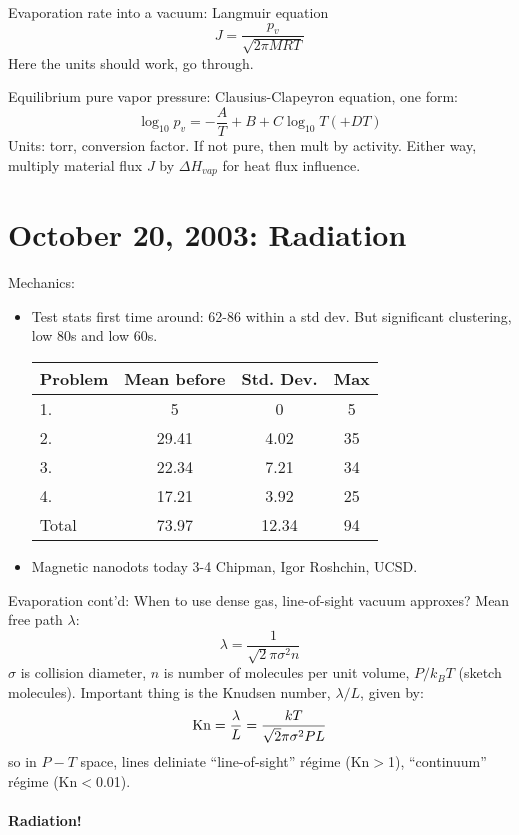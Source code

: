 \documentclass{report}
\begin{document}
Evaporation rate into a vacuum: Langmuir equation
$$J = \frac{p_v}{\sqrt{2\pi MRT}}$$
Here the units should work, go through.

Equilibrium pure vapor pressure: Clausius-Clapeyron equation, one form:
$$\log_{10}p_v = -\frac{A}{T} + B + C\log_{10}T (+ DT)$$
Units: torr, conversion factor.  If not pure, then mult by activity.  Either
way, multiply material flux $J$ by $\Delta H_{vap}$ for heat flux influence.
\newpage


\section{October 20, 2003: Radiation}

Mechanics:
\begin{itemize}
\item Test stats first time around: 62-86 within a std dev.  But significant
  clustering, low 80s and low 60s.
  \begin{center}
    \begin{tabular}{l|ccc|}
      Problem & Mean before & Std. Dev. & Max \\
      \hline
      1. & 5 & 0 & 5 \\
      2. & 29.41 & 4.02 & 35 \\
      3. & 22.34 & 7.21 & 34 \\
      4. & 17.21 & 3.92 & 25 \\ \hline
      Total & 73.97 & 12.34 & 94 \\ \hline
    \end{tabular}
  \end{center}
\item Magnetic nanodots today 3-4 Chipman, Igor Roshchin, UCSD.
\end{itemize}

Evaporation cont'd: When to use dense gas, line-of-sight vacuum approxes?  Mean
free path $\lambda$:
$$\lambda=\frac{1}{\sqrt{2}\pi\sigma^2n}$$
$\sigma$ is collision diameter, $n$ is number of molecules per unit volume,
$P/k_BT$ (sketch molecules).  Important thing is the Knudsen number,
$\lambda/L$, given by:
$${\rm Kn} = \frac{\lambda}{L} = \frac{kT}{\sqrt{2}\pi\sigma^2PL}$$
so in $P-T$ space, lines deliniate ``line-of-sight'' r\'{e}gime (Kn$>$1),
``continuum'' r\'{e}gime (Kn$<$0.01).

\paragraph{Radiation!}
\end{document}
